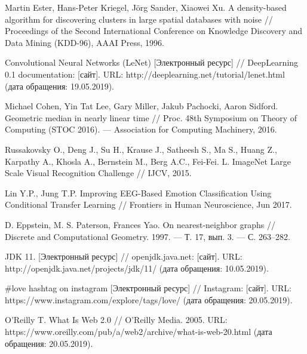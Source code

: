 \begingroup 
\renewcommand{\section}[2]{\anonsection{Библиографический список}}
\begin{thebibliography}{00}

    Martin Ester, Hans-Peter Kriegel, Jörg Sander, Xiaowei Xu.
    A density-based algorithm for discovering clusters in large spatial databases with noise // 
    Proceedings of the Second International Conference on Knowledge Discovery and Data Mining (KDD-96),
    AAAI Press, 
    1996.

    Convolutional Neural Networks (LeNet) 
    [Электронный ресурс] // 
    DeepLearning 0.1 documentation: [сайт]. 
    URL: http://deeplearning.net/tutorial/lenet.html 
    (дата обращения: 19.05.2019).

    Michael Cohen, Yin Tat Lee, Gary Miller, Jakub Pachocki, Aaron Sidford. 
    Geometric median in nearly linear time // 
    Proc. 48th Symposium on Theory of Computing (STOC 2016). — Association for Computing Machinery, 
    2016.

    Russakovsky O., Deng J., Su H., Krause J., Satheesh S., Ma S., Huang Z., Karpathy A., Khosla A., Bernstein M., Berg A.C., Fei-Fei. L. 
    ImageNet Large Scale Visual Recognition Challenge // 
    IJCV, 
    2015.

    Lin Y.P., Jung T.P.
    Improving EEG-Based Emotion Classification Using Conditional Transfer Learning //
    Frontiers in Human Neuroscience, 
    Jun 2017.

    D. Eppstein, M. S. Paterson, Frances Yao. 
    On nearest-neighbor graphs // 
    Discrete and Computational Geometry. 
    1997. — Т. 17, вып. 3. — С. 263–282.

    JDK 11.
    [Электронный ресурс] // 
    openjdk.java.net: [сайт]. 
    URL: http://openjdk.java.net/projects/jdk/11/
    (дата обращения: 10.05.2019).

    #love hashtag on instagram 
    [Электронный ресурс] // 
    Instagram: [сайт]. 
    URL: https://www.instagram.com/explore/tags/love/ 
    (дата обращения: 20.05.2019).

    O'Reilly T. What Is Web 2.0 // 
    O’Reilly Media. 
    2005. 
    URL: https://www.oreilly.com/pub/a/web2/archive/what-is-web-20.html 
    (дата обращения: 20.05.2019).


\end{thebibliography}
